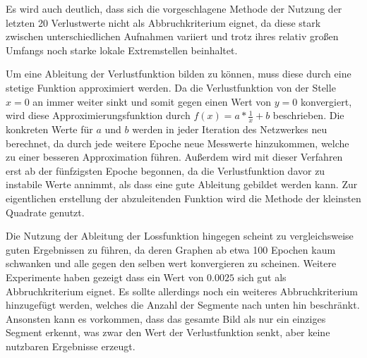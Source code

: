 Es wird auch deutlich, dass sich die vorgeschlagene Methode der Nutzung der letzten 20 Verlustwerte nicht als Abbruchkriterium eignet, da diese stark zwischen unterschiedlichen Aufnahmen variiert und trotz ihres relativ großen Umfangs noch starke lokale Extremstellen beinhaltet.

Um eine Ableitung der Verlustfunktion bilden zu können, muss diese durch eine stetige Funktion approximiert werden. Da die Verlustfunktion von der Stelle $x=0$ an immer weiter sinkt und somit gegen einen Wert von $y=0$ konvergiert, wird diese Approximierungsfunktion durch $f(x) = a*\frac{1}{x}+b$ beschrieben. Die konkreten Werte für $a$ und $b$ werden in jeder Iteration des Netzwerkes neu berechnet, da durch jede weitere Epoche neue Messwerte hinzukommen, welche zu einer besseren Approximation führen. Außerdem wird mit dieser Verfahren erst ab der fünfzigsten Epoche begonnen, da die Verlustfunktion davor zu instabile Werte annimmt, als dass eine gute Ableitung gebildet werden kann. Zur eigentlichen erstellung der abzuleitenden Funktion wird die Methode der kleinsten Quadrate genutzt.

Die Nutzung der Ableitung der Lossfunktion hingegen scheint zu vergleichsweise guten Ergebnissen zu führen, da deren Graphen ab etwa 100 Epochen kaum schwanken und alle gegen den selben wert konvergieren zu scheinen. Weitere Experimente haben gezeigt dass ein Wert von $0.0025$ sich gut als Abbruchkriterium eignet. Es sollte allerdings noch ein weiteres Abbruchkriterium hinzugefügt werden, welches die Anzahl der Segmente nach unten hin beschränkt. Ansonsten kann es vorkommen, dass das gesamte Bild als nur ein einziges Segment erkennt, was zwar den Wert der Verlustfunktion senkt, aber keine nutzbaren Ergebnisse erzeugt.

